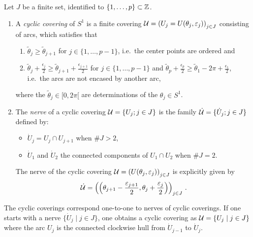 \begin{defn}
  Let $J$ be a finite set, identified to $\{1,\dots,p\}\subset\mathbb{Z}$.
  \begin{enumerate}
    \item A \emph{cyclic covering} of $S^1$ is a finite covering
      $\mathcal{U}=\left(U_j=U(\theta_j,\varepsilon_j)\right)_{j\in J}$ consisting of
      arcs, which satisfies that
      \begin{enumerate}
        \item $\tilde\theta_j \geq \tilde\theta_{j+1}$ for
          $j\in\{1,\dots,p-1\}$, i.e.\ the center points are ordered and
        \item $\tilde\theta_j+\frac{\epsilon_j}{2}\geq
          \tilde\theta_{j+1}+\frac{\epsilon_{j+1}}{2}$ for
          $j\in\{1,\dots,p-1\}$ and
          $\tilde\theta_p+\frac{\epsilon_p}{2}\geq
          \tilde\theta_{1}-2\pi+\frac{\epsilon_{1}}{2}$, i.e.\ the arcs are not
          encased by another arc,
      \end{enumerate}
      where the $\tilde\theta_j\in [0,2\pi[$ are determinations of the
      $\theta_j\in S^1$.
      \begin{comment}
        \begin{enumerate}
          \item the $\theta_j$ are in ascending order with respect to the
            clockwise orientation of $S^1$;
          \item the $U_j\cap U_{j+1}$ have only one connected component when
            $\#J>2$;
          \item the $U_j$ are not encased by another arc, this means that the
            open sets $U_j\backslash U_l$ are connected for all $j,l\in J$.
        \end{enumerate}
      \end{comment}
    \item The \emph{nerve} of a cyclic covering $\mathcal{U}=\{U_j;j\in J\}$ is the
      family $\dot{\mathcal{U}}=\{\dot U_j;j\in J\}$ defined by:
      \begin{itemize}
        \item $\dot U_j=U_j\cap U_{j+1}$ when $\#J>2$,
        \item $\dot U_1$ and $\dot U_2$ the connected components of
          $U_1\cap U_2$ when $\#J=2$.
      \end{itemize}
      \begin{s-rem}
        The nerve of the cyclic covering
        $\mathcal{U}=\left(U(\theta_j,\varepsilon_j)\right)_{j\in J}$ is explicitly given
        by
        \[
          \dot{\mathcal{U}}=\left(
            \left(\theta_{j+1}-\frac{\varepsilon_{j+1}}{2},
            \theta_{j}+\frac{\varepsilon_{j}}{2}\right)
          \right)_{j\in J} \,.
        \]
      \end{s-rem}
  \end{enumerate}
\end{defn}
The cyclic coverings correspond one-to-one to nerves of cyclic coverings. If
one starts with a nerve $\{\dot U_j \mid j\in J\}$, one obtains a cyclic
covering as $\mathcal{U}=\{U_j \mid j\in J\}$ where the arc $U_j$ is the connected
clockwise hull from $\dot U_{j-1}$ to $\dot U_j$.

